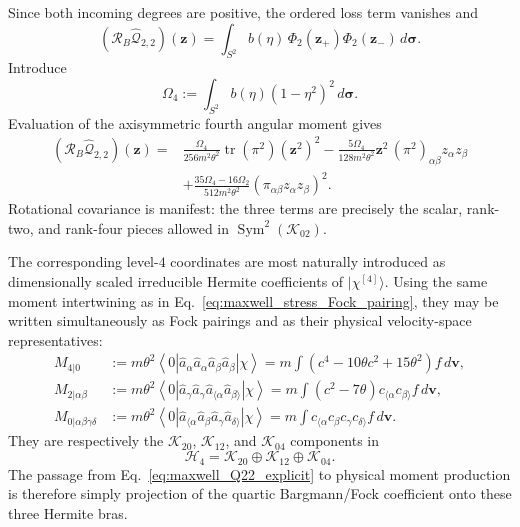 \documentclass[11pt,oneside]{article}
\numberwithin{equation}{section}
\theoremstyle{definition}
\begin{document}
Since both incoming degrees are positive, the ordered loss term vanishes and
\begin{equation}
(\mathcal R_B\widehat{\mathcal Q}_{2,2})(\bm z)
=\int_{S^2}b(\eta)\,\Phi_2(\bm z_+)\Phi_2(\bm z_-)\,d\bm\sigma.
\label{eq:maxwell_Q22_Bargmann_start}
\end{equation}
Introduce
\begin{equation}
 \Omega_4:=\int_{S^2}b(\eta)(1-\eta^2)^2\,d\bm\sigma.
\label{eq:maxwell_Omega4}
\end{equation}
Evaluation of the axisymmetric fourth angular moment gives
\begin{equation}
\begin{aligned}
(\mathcal R_B\widehat{\mathcal Q}_{2,2})(\bm z)
={}&\frac{\Omega_4}{256m^2\theta^2}
 \operatorname{tr}(\pi^2)(\bm z^2)^2
-\frac{5\Omega_4}{128m^2\theta^2}\bm z^2\,
 (\pi^2)_{\alpha\beta}z_\alpha z_\beta\\
&+\frac{35\Omega_4-16\Omega_2}{512m^2\theta^2}
 (\pi_{\alpha\beta}z_\alpha z_\beta)^2.
\end{aligned}
\label{eq:maxwell_Q22_explicit}
\end{equation}
Rotational covariance is manifest: the three terms are precisely the scalar, rank-two, and rank-four pieces allowed in
$\operatorname{Sym}^2(\mathscr K_{02})$.

The corresponding level-$4$ coordinates are most naturally introduced as dimensionally scaled irreducible Hermite coefficients of $|\chi^{[4]}\rangle$.  Using the same moment intertwining as in Eq.~\eqref{eq:maxwell_stress_Fock_pairing}, they may be written simultaneously as Fock pairings and as their physical velocity-space representatives:
\begin{align}
M_{4|0}
&:=m\theta^2
\left\langle0\left|\hat a_\alpha\hat a_\alpha
\hat a_\beta\hat a_\beta\right|\chi\right\rangle
=m\int
\left(c^4-10\theta c^2+15\theta^2\right)f\,d\bm v,
\label{eq:maxwell_M40_def}\\
M_{2|\alpha\beta}
&:=m\theta^2
\left\langle0\left|\hat a_\gamma\hat a_\gamma
\hat a_{\langle\alpha}\hat a_{\beta\rangle}\right|\chi\right\rangle
=m\int
(c^2-7\theta)c_{\langle\alpha}c_{\beta\rangle}f\,d\bm v,
\label{eq:maxwell_M2ab_def}\\
M_{0|\alpha\beta\gamma\delta}
&:=m\theta^2
\left\langle0\left|
\hat a_{\langle\alpha}\hat a_\beta\hat a_\gamma\hat a_{\delta\rangle}
\right|\chi\right\rangle
=m\int
c_{\langle\alpha}c_\beta c_\gamma c_{\delta\rangle}f\,d\bm v.
\label{eq:maxwell_M0abcd_def}
\end{align}
They are respectively the $\mathscr K_{20}$, $\mathscr K_{12}$, and $\mathscr K_{04}$ components in
\begin{equation}
 \mathscr H_4
 =\mathscr K_{20}\oplus\mathscr K_{12}\oplus\mathscr K_{04}.
\label{eq:maxwell_H4_irreducible_split}
\end{equation}
The passage from Eq.~\eqref{eq:maxwell_Q22_explicit} to physical moment production is therefore simply projection of the quartic Bargmann/Fock coefficient onto these three Hermite bras.
\end{document}
